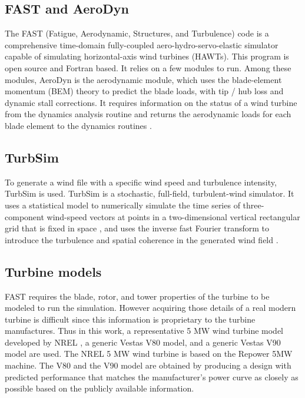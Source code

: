 \documentclass{umthesis}
\begin{document}
\subsection{FAST and AeroDyn}
The FAST (Fatigue, Aerodynamic, Structures, and Turbulence) code is a comprehensive time-domain fully-coupled aero-hydro-servo-elastic simulator capable of simulating horizontal-axis wind turbines (HAWTs). This program is open source and Fortran based. It relies on a few modules to run.  Among these modules, AeroDyn is the aerodynamic module, which uses the blade-element momentum (BEM) theory to predict the blade loads, with tip / hub loss and dynamic stall corrections. It requires information on the status of a wind turbine from the dynamics analysis routine and returns the aerodynamic loads for each blade element to the dynamics routines \cite{FAST}.


\subsection{TurbSim}
To generate a wind file with a specific wind speed and turbulence intensity, TurbSim is used. TurbSim is a stochastic, full-field, turbulent-wind simulator. It uses a statistical model to numerically simulate the time series of three-component wind-speed vectors at points in a two-dimensional vertical rectangular grid that is fixed in space \cite{Turbsim}, and uses the inverse fast Fourier transform to introduce the turbulence and spatial coherence in the generated wind field \cite{Shinozuka}.


\subsection{Turbine models}
FAST requires the blade, rotor, and tower properties of the turbine to be modeled to run the simulation. However acquiring those details of a real modern turbine is difficult since this information is proprietary to the turbine manufactures. Thus in this work, a representative 5 MW wind turbine model developed by NREL \cite{NREL5MW}, a generic Vestas V80 model, and a generic Vestas V90 model \cite{Churchfield_turbine} are used. The NREL 5 MW wind turbine is based on the Repower 5MW machine. The V80 and the V90 model are obtained by producing a design with predicted performance that matches the manufacturer’s power curve as closely as possible based on the publicly available information.
\end{document}

